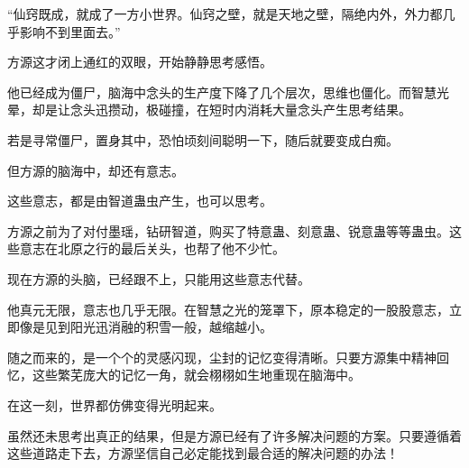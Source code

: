 \begin{this_body}
“仙窍既成，就成了一方小世界。仙窍之壁，就是天地之壁，隔绝内外，外力都几乎影响不到里面去。”

方源这才闭上通红的双眼，开始静静思考感悟。

他已经成为僵尸，脑海中念头的生产度下降了几个层次，思维也僵化。而智慧光晕，却是让念头迅攒动，极碰撞，在短时内消耗大量念头产生思考结果。

若是寻常僵尸，置身其中，恐怕顷刻间聪明一下，随后就要变成白痴。

但方源的脑海中，却还有意志。

这些意志，都是由智道蛊虫产生，也可以思考。

方源之前为了对付墨瑶，钻研智道，购买了特意蛊、刻意蛊、锐意蛊等等蛊虫。这些意志在北原之行的最后关头，也帮了他不少忙。

现在方源的头脑，已经跟不上，只能用这些意志代替。

他真元无限，意志也几乎无限。在智慧之光的笼罩下，原本稳定的一股股意志，立即像是见到阳光迅消融的积雪一般，越缩越小。

随之而来的，是一个个的灵感闪现，尘封的记忆变得清晰。只要方源集中精神回忆，这些繁芜庞大的记忆一角，就会栩栩如生地重现在脑海中。

在这一刻，世界都仿佛变得光明起来。

虽然还未思考出真正的结果，但是方源已经有了许多解决问题的方案。只要遵循着这些道路走下去，方源坚信自己必定能找到最合适的解决问题的办法！

\end{this_body}

